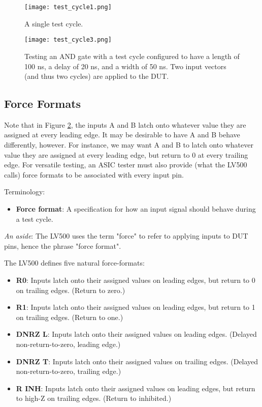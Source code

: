 \begin{figure}
\texttt{[image: test\_cycle1.png]}
\caption{A single test cycle.}
\label{fig:singleTestCycle}
\end{figure}

\begin{figure}
\texttt{[image: test\_cycle3.png]}
\caption{Testing an AND gate with a test cycle configured to have a length of 100 ns, a delay of 20 ns, and a width of 50 ns. Two input vectors (and thus two cycles) are applied to the DUT.}
\label{fig:ANDGateTestCycle}
\end{figure}

\subsection{Force Formats}
Note that in Figure \ref{fig:ANDGateTestCycle}, the inputs A and B latch onto whatever value they are assigned at every leading edge. It may be desirable to have A and B behave differently, however. For instance, we may want A and B to latch onto whatever value they are assigned at every leading edge, but return to 0 at every trailing edge. For versatile testing, an ASIC tester must also provide (what the LV500 calls) force formats to be associated with every input pin.

\begin{flushleft}
Terminology: 
\begin{itemize}
\item \textbf{Force format}: A specification for how an input signal should behave during a test cycle. 
\end{itemize}
\end{flushleft}

\textit{An aside}: The LV500 uses the term "force" to refer to applying inputs to DUT pins, hence the phrase "force format".

The LV500 defines five natural force-formats: 
\begin{itemize}
\item \textbf{R0}: Inputs latch onto their assigned values on leading edges, but return to 0 on trailing edges. (Return to zero.)
\item \textbf{R1}: Inputs latch onto their assigned values on leading edges, but return to 1 on trailing edges. (Return to one.)
\item \textbf{DNRZ L}: Inputs latch onto their assigned values on leading edges. (Delayed non-return-to-zero, leading edge.)
\item \textbf{DNRZ T}: Inputs latch onto their assigned values on trailing edges. (Delayed non-return-to-zero, trailing edge.)
\item \textbf{R INH}: Inputs latch onto their assigned values on leading edges, but return to high-Z on trailing edges. (Return to inhibited.)
\end{itemize}

